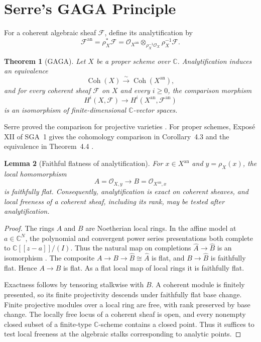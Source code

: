 \documentclass[11pt,reqno]{amsart}
\newtheorem{theorem}{Theorem}[section]
\newtheorem{lemma}[theorem]{Lemma}
\theoremstyle{definition}
\theoremstyle{remark}
\newcommand{\C}{\mathbb{C}}
\newcommand{\OO}{\mathcal{O}}
\newcommand{\Xan}{X^{\mathrm{an}}}
\newcommand{\Fan}{\mathcal{F}^{\mathrm{an}}}
\DeclareMathOperator{\Coh}{Coh}
\begin{document}
\section{Serre's GAGA Principle}
\label{sec:gaga}

For a coherent algebraic sheaf $\mathcal F$, define its analytification by
\[
\Fan=\rho_X^*\mathcal F
=\OO_{\Xan}\otimes_{\rho_X^{-1}\OO_X}\rho_X^{-1}\mathcal F.
\]

\begin{theorem}[GAGA]
\label{thm:gaga}
Let $X$ be a proper scheme over $\C$. Analytification induces an equivalence
\[
\Coh(X)\xrightarrow{\sim}\Coh(\Xan),
\]
and for every coherent sheaf $\mathcal F$ on $X$ and every $i\geq0$, the
comparison morphism
\[
H^i(X,\mathcal F)\longrightarrow H^i(\Xan,\Fan)
\]
is an isomorphism of finite-dimensional $\C$-vector spaces.
\end{theorem}

Serre proved the comparison for projective varieties
\cite[\S12, Thms.~1--3]{serre1956gaga}. For proper schemes, Expos\'e XII of
SGA~1 gives the cohomology comparison in Corollary~4.3 and the equivalence
in Theorem~4.4 \cite{sga1}.

\begin{lemma}[Faithful flatness of analytification]
\label{lem:flat}
For $x\in\Xan$ and $y=\rho_X(x)$, the local homomorphism
\[
A=\OO_{X,y}\longrightarrow B=\OO_{\Xan,x}
\]
is faithfully flat. Consequently, analytification is exact on coherent
sheaves, and local freeness of a coherent sheaf, including its rank, may be
tested after analytification.
\end{lemma}

\begin{proof}
The rings $A$ and $B$ are Noetherian local rings. In the affine model at
$a\in\C^N$, the polynomial and convergent power series presentations both
complete to $\C[[z-a]]/(I)$. Thus the natural map on completions
$\widehat A\to\widehat B$ is an isomorphism
\cite[Exp.~XII, Thm.\ and Def.~1.1]{sga1}. The composite
$A\to B\to\widehat B\cong\widehat A$ is flat, and
$B\to\widehat B$ is faithfully flat. Hence $A\to B$ is flat. As a flat
local map of local rings it is faithfully flat.

Exactness follows by tensoring stalkwise with $B$. A coherent module is
finitely presented, so its finite projectivity descends under faithfully
flat base change. Finite projective modules over a local ring are free,
with rank preserved by base change. The locally free locus of a coherent
sheaf is open, and every nonempty closed subset of a finite-type
$\C$-scheme contains a closed point. Thus it suffices to test local freeness
at the algebraic stalks corresponding to analytic points.
\end{proof}
\end{document}
